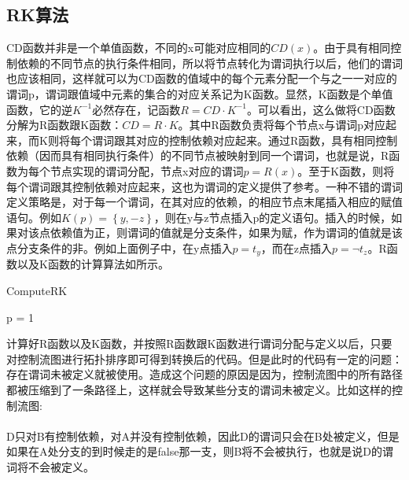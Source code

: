 \subsection{RK算法}

CD函数并非是一个单值函数，不同的x可能对应相同的$CD\left(x\right)$。由于具有相同控制依赖的不同节点的执行条件相同，所以将节点转化为谓词执行以后，他们的谓词也应该相同，这样就可以为CD函数的值域中的每个元素分配一个与之一一对应的谓词p，谓词跟值域中元素的集合的对应关系记为K函数。显然，K函数是个单值函数，它的逆$K^{-1}$必然存在，记函数$R=CD\cdot K^{-1}$。可以看出，这么做将CD函数分解为R函数跟K函数：$CD=R\cdot K$。其中R函数负责将每个节点x与谓词p对应起来，而K则将每个谓词跟其对应的控制依赖对应起来。通过R函数，具有相同控制依赖（因而具有相同执行条件）的不同节点被映射到同一个谓词，也就是说，R函数为每个节点实现的谓词分配，节点x对应的谓词$p=R\left(x\right)$。至于K函数，则将每个谓词跟其控制依赖对应起来，这也为谓词的定义提供了参考。一种不错的谓词定义策略是，对于每一个谓词，在其对应的依赖，的相应节点末尾插入相应的赋值语句。例如$K\left(p\right)=\left\{y,-z\right\}$，则在y与z节点插入p的定义语句。插入的时候，如果对该点依赖值为正，则谓词的值就是分支条件，如果为赋，作为谓词的值就是该点分支条件的非。例如上面例子中，在y点插入$p=t_y$，而在z点插入$p=\neg t_z$。R函数以及K函数的计算算法如所示。

\begin{algorithm}[H]
	\label{alg:ComputeRK}
	\caption{ComputeRK}
	p = 1
\end{algorithm}
计算好R函数以及K函数，并按照R函数跟K函数进行谓词分配与定义以后，只要对控制流图进行拓扑排序即可得到转换后的代码。但是此时的代码有一定的问题：存在谓词未被定义就被使用。造成这个问题的原因是因为，控制流图中的所有路径都被压缩到了一条路径上，这样就会导致某些分支的谓词未被定义。比如这样的控制流图:\\
\\
D只对B有控制依赖，对A并没有控制依赖，因此D的谓词只会在B处被定义，但是如果在A处分支的到时候走的是false那一支，则B将不会被执行，也就是说D的谓词将不会被定义。

